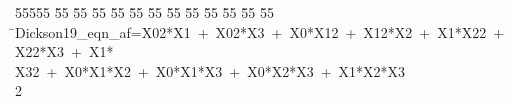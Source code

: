 %
%
\begin{tabbing}
55555 \= 55 \= 55 \= 55 \= 55 \= 55 \= 55 \= 55 \= 55 \= 55 \= 55 \= 55 \= 55 \= \>Dickson19\_eqn\_af=X02*X1\ +\ X02*X3\ +\ X0*X12\ +\ X12*X2\ +\ X1*X22\ +\ X22*X3\ +\ X1*\\[0pt]
\>X32\ +\ X0*X1*X2\ +\ X0*X1*X3\ +\ X0*X2*X3\ +\ X1*X2*X3\\[0pt]
2\>\end{tabbing}
